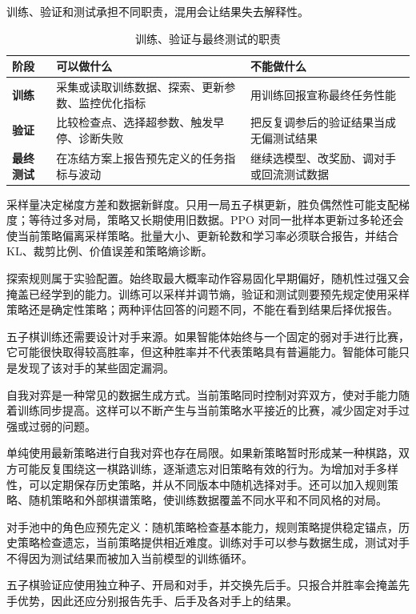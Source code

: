训练、验证和测试承担不同职责，混用会让结果失去解释性。

\begin{table}[htbp]
  \centering
  \caption{训练、验证与最终测试的职责}
  \label{tab:train-validation-test}
  \begin{tabularx}{\linewidth}{>{\bfseries}p{2.3cm}p{4.3cm}X}
    \toprule
    阶段 & 可以做什么 & 不能做什么 \\
    \midrule
    训练 & 采集或读取训练数据、探索、更新参数、监控优化指标 & 用训练回报宣称最终任务性能 \\
    验证 & 比较检查点、选择超参数、触发早停、诊断失败 & 把反复调参后的验证结果当成无偏测试结果 \\
    最终测试 & 在冻结方案上报告预先定义的任务指标与波动 & 继续选模型、改奖励、调对手或回流测试数据 \\
    \bottomrule
  \end{tabularx}
\end{table}


采样量决定梯度方差和数据新鲜度。只用一局五子棋更新，胜负偶然性可能支配梯度；等待过多对局，策略又长期使用旧数据。PPO 对同一批样本更新过多轮还会使当前策略偏离采样策略。批量大小、更新轮数和学习率必须联合报告，并结合 KL、裁剪比例、价值误差和策略熵诊断。

探索规则属于实验配置。始终取最大概率动作容易固化早期偏好，随机性过强又会掩盖已经学到的能力。训练可以采样并调节熵，验证和测试则要预先规定使用采样策略还是确定性策略；两种评估回答的问题不同，不能在看到结果后择优报告。

五子棋训练还需要设计对手来源。如果智能体始终与一个固定的弱对手进行比赛，它可能很快取得较高胜率，但这种胜率并不代表策略具有普遍能力。智能体可能只是发现了该对手的某些固定漏洞。

自我对弈是一种常见的数据生成方式。当前策略同时控制对弈双方，使对手能力随着训练同步提高。这样可以不断产生与当前策略水平接近的比赛，减少固定对手过强或过弱的问题。

单纯使用最新策略进行自我对弈也存在局限。如果新策略暂时形成某一种棋路，双方可能反复围绕这一棋路训练，逐渐遗忘对旧策略有效的行为。为增加对手多样性，可以定期保存历史策略，并从不同版本中随机选择对手。还可以加入规则策略、随机策略和外部棋谱策略，使训练数据覆盖不同水平和不同风格的对局。


对手池中的角色应预先定义：随机策略检查基本能力，规则策略提供稳定锚点，历史策略检查遗忘，当前策略提供相近难度。训练对手可以参与数据生成，测试对手不得因为测试结果而被加入当前模型的训练循环。

五子棋验证应使用独立种子、开局和对手，并交换先后手。只报合并胜率会掩盖先手优势，因此还应分别报告先手、后手及各对手上的结果。

